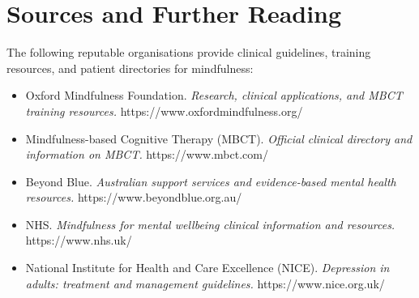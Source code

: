 \section*{Sources and Further Reading}
The following reputable organisations provide clinical guidelines, training resources, and patient directories for mindfulness:
\begin{itemize}
    \item Oxford Mindfulness Foundation. \textit{Research, clinical applications, and MBCT training resources.} https://www.oxfordmindfulness.org/
    \item Mindfulness-based Cognitive Therapy (MBCT). \textit{Official clinical directory and information on MBCT.} https://www.mbct.com/
    \item Beyond Blue. \textit{Australian support services and evidence-based mental health resources.} https://www.beyondblue.org.au/
    \item NHS. \textit{Mindfulness for mental wellbeing clinical information and resources.} https://www.nhs.uk/
    \item National Institute for Health and Care Excellence (NICE). \textit{Depression in adults: treatment and management guidelines.} https://www.nice.org.uk/
\end{itemize}

\clearpage

